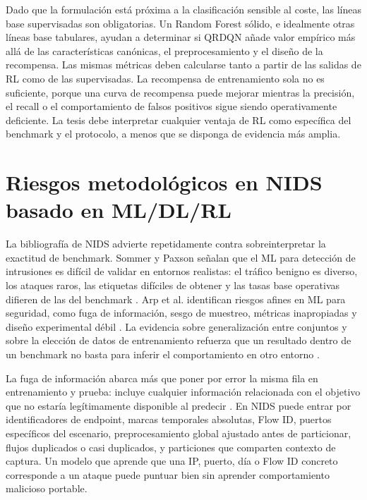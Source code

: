 Dado que la formulación está próxima a la clasificación sensible al coste, las líneas base supervisadas son obligatorias. Un Random Forest sólido, e idealmente otras líneas base tabulares, ayudan a determinar si QRDQN añade valor empírico más allá de las características canónicas, el preprocesamiento y el diseño de la recompensa. Las mismas métricas deben calcularse tanto a partir de las salidas de RL como de las supervisadas. La recompensa de entrenamiento sola no es suficiente, porque una curva de recompensa puede mejorar mientras la precisión, el recall o el comportamiento de falsos positivos sigue siendo operativamente deficiente. La tesis debe interpretar cualquier ventaja de RL como específica del benchmark y el protocolo, a menos que se disponga de evidencia más amplia.

\section{Riesgos metodológicos en NIDS basado en ML/DL/RL}

La bibliografía de NIDS advierte repetidamente contra sobreinterpretar la exactitud de benchmark. Sommer y Paxson señalan que el ML para detección de intrusiones es difícil de validar en entornos realistas: el tráfico benigno es diverso, los ataques raros, las etiquetas difíciles de obtener y las tasas base operativas difieren de las del benchmark \parencite{SommerPaxson2010ClosedWorld}. Arp et al. identifican riesgos afines en ML para seguridad, como fuga de información, sesgo de muestreo, métricas inapropiadas y diseño experimental débil \parencite{Arp2020DosDontsMLSecurity}. La evidencia sobre generalización entre conjuntos y sobre la elección de datos de entrenamiento refuerza que un resultado dentro de un benchmark no basta para inferir el comportamiento en otro entorno \parencite{Layeghy2022,Cantone2024,TrainingData2025Generalizability,Layeghy2023CrossDomainNIDS}.

La fuga de información abarca más que poner por error la misma fila en entrenamiento y prueba: incluye cualquier información relacionada con el objetivo que no estaría legítimamente disponible al predecir \parencite{Kaufman2011LeakageDataMining}. En NIDS puede entrar por identificadores de endpoint, marcas temporales absolutas, Flow ID, puertos específicos del escenario, preprocesamiento global ajustado antes de particionar, flujos duplicados o casi duplicados, y particiones que comparten contexto de captura. Un modelo que aprende que una IP, puerto, día o Flow ID concreto corresponde a un ataque puede puntuar bien sin aprender comportamiento malicioso portable.

